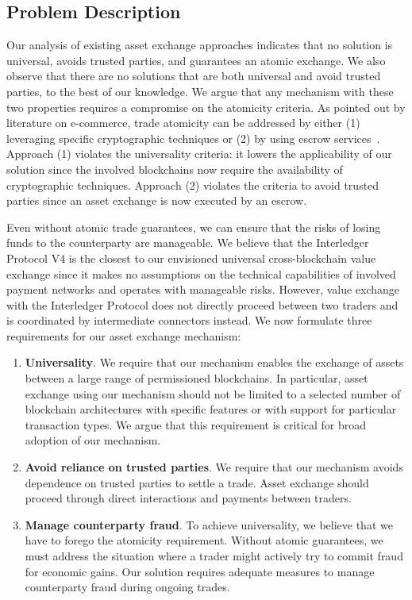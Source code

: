 \subsection{Problem Description}
\label{sec:problem_description}
Our analysis of existing asset exchange approaches indicates that no solution is universal, avoids trusted parties, and guarantees an atomic exchange.
We also observe that there are no solutions that are both universal and avoid trusted parties, to the best of our knowledge.
We argue that any mechanism with these two properties requires a compromise on the atomicity criteria.
As pointed out by literature on e-commerce, trade atomicity can be addressed by either (1) leveraging specific cryptographic techniques or (2) by using escrow services~\cite{ray2002fair}.
Approach (1) violates the universality criteria: it lowers the applicability of our solution since the involved blockchains now require the availability of cryptographic techniques.
Approach (2) violates the criteria to avoid trusted parties since an asset exchange is now executed by an escrow.

Even without atomic trade guarantees, we can ensure that the risks of losing funds to the counterparty are manageable.
We believe that the Interledger Protocol V4 is the closest to our envisioned universal cross-blockchain value exchange since it makes no assumptions on the technical capabilities of involved payment networks and operates with manageable risks.
However, value exchange with the Interledger Protocol does not directly proceed between two traders and is coordinated by intermediate connectors instead.
We now formulate three requirements for our asset exchange mechanism:

\begin{enumerate}
	\item \textbf{Universality}. We require that our mechanism enables the exchange of assets between a large range of permissioned blockchains.
	In particular, asset exchange using our mechanism should not be limited to a selected number of blockchain architectures with specific features or with support for particular transaction types.
	We argue that this requirement is critical for broad adoption of our mechanism.
	\item \textbf{Avoid reliance on trusted parties}. We require that our mechanism avoids dependence on trusted parties to settle a trade. Asset exchange should proceed through direct interactions and payments between traders.
	\item \textbf{Manage counterparty fraud}. To achieve universality, we believe that we have to forego the atomicity requirement.
	Without atomic guarantees, we must address the situation where a trader might actively try to commit fraud for economic gains.
	Our solution requires adequate measures to manage counterparty fraud during ongoing trades.
\end{enumerate}

